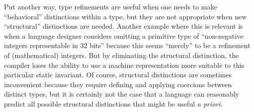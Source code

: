 Put another way, type refinements are useful when one needs to make ``behavioral'' distinctions within a type, but they are not appropriate when new ``structural'' distinctions are needed. Another example where this is relevant is when a language designer considers omitting a primitive type of ``non-negative integers representable in 32 bits'' because this seems ``merely'' to be a refinement of (mathematical) integers. But by eliminating the structural distinction, the compiler loses the ability to use a machine representation more suitable to this particular static invariant. Of course, structural distinctions are sometimes inconvenient because they require defining and applying coercions between distinct types, but it is certainly not the case that a language can reasonably predict all possible structural distinctions that might be useful \emph{a priori}. %






